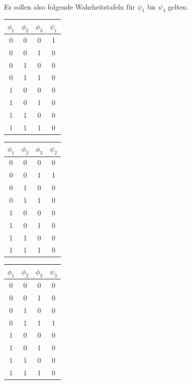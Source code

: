 \documentclass[11pt,a4paper,leqno]{report}
\numberwithin{equation}{chapter}
\begin{document}
\\
Es sollen also folgende Wahrheitstafeln f\"ur $\psi_1$ bis $\psi_4$ gelten.
\begin{center}
	\begin{minipage}{1.2in}
		\begin{tabular}{|c c c|c|}
			$\phi_1$ & $\phi_2$ & $\phi_3$ &$\psi_1$\\
			\hline
			0 & 0 & 0 & 1\\
			0 & 0 & 1 & 0\\
			0 & 1 & 0 & 0\\
			0 & 1 & 1 & 0\\
			1 & 0 & 0 & 0\\
			1 & 0 & 1 & 0\\
			1 & 1 & 0 & 0\\
			1 & 1 & 1 & 0\\
			\hline
		\end{tabular}  
	\end{minipage}
	\begin{minipage}{1.2in}
		\begin{tabular}{|c c c|c|}
			$\phi_1$ & $\phi_2$ & $\phi_3$ &$\psi_2$\\
			\hline
			0 & 0 & 0 & 0\\
			0 & 0 & 1 & 1\\
			0 & 1 & 0 & 0\\
			0 & 1 & 1 & 0\\
			1 & 0 & 0 & 0\\
			1 & 0 & 1 & 0\\
			1 & 1 & 0 & 0\\
			1 & 1 & 1 & 0\\
			\hline
	\end{tabular}
	\end{minipage}  
	\begin{minipage}{1.2in}
		\begin{tabular}{|c c c|c|}
			$\phi_1$ & $\phi_2$ & $\phi_3$ &$\psi_3$\\
			\hline
			0 & 0 & 0 & 0\\
			0 & 0 & 1 & 0\\
			0 & 1 & 0 & 0\\
			0 & 1 & 1 & 1\\
			1 & 0 & 0 & 0\\
			1 & 0 & 1 & 0\\
			1 & 1 & 0 & 0\\
			1 & 1 & 1 & 0\\
			\hline
		\end{tabular}  
	\end{minipage}

\end{center}
\end{document}
